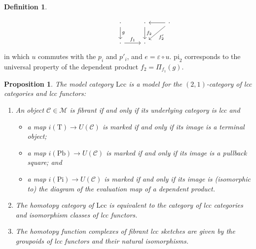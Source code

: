 \documentclass[a4paper]{article}
\newtheorem{proposition}[theorem]{Proposition}
\theoremstyle{remark}
\theoremstyle{definition}
\newtheorem{definition}[theorem]{Definition}
\begin{document}
\begin{definition}
\begin{itemize}
\begin{equation}
\begin{tikzcd}
          & & \cdot \arrow[d, "g"] & \cdot \arrow[d, "f_2"] & \cdot \arrow[dl, "f'_2"] \arrow[l] \\
          & & \cdot \arrow[r, "f_1"] & \cdot
        \end{tikzcd}
      \end{equation}
      in which $u$ commutes with the $p_i$ and $p'_i$, and $e = \varepsilon \circ u$.
      $\mathrm{pi}_2$ corresponds to the universal property of the dependent product $f_2 = \Pi_{f_1}(g)$.
  \end{itemize}
\end{definition}

\begin{proposition}
  \label{prop:lcc-model-cat}
  The model category $\mathrm{Lcc}$ is a model for the $(2, 1)$-category of lcc categories and lcc functors:
  \begin{enumerate}
    \item
      \label{itm:lcc-fibrant-objects}
      An object $\mathcal{C} \in \mathcal{M}$ is fibrant if and only if its underlying category is lcc and
      \begin{itemize}
        \item
          a map $i(\mathrm{T}) \rightarrow U(\mathcal{C})$ is marked if and only if its image is a terminal object;
        \item
          a map $i(\mathrm{Pb}) \rightarrow U(\mathcal{C})$ is marked if and only if its image is a  pullback square; and
        \item
          a map $i(\mathrm{Pi}) \rightarrow U(\mathcal{C})$ is marked if and only if its image is (isomorphic to) the diagram of the evaluation map of a dependent product.
      \end{itemize}
    \item
      \label{itm:lcc-homotopy-category}
      The homotopy category of $\mathrm{Lcc}$ is equivalent to the category of lcc categories and isomorphism classes of lcc functors.
    \item
      \label{itm:lcc-homotopy-function-complexes}
      The homotopy function complexes of fibrant lcc sketches are given by the groupoids of lcc functors and their natural isomorphisms.
  \end{enumerate}
\end{proposition}
\end{document}
